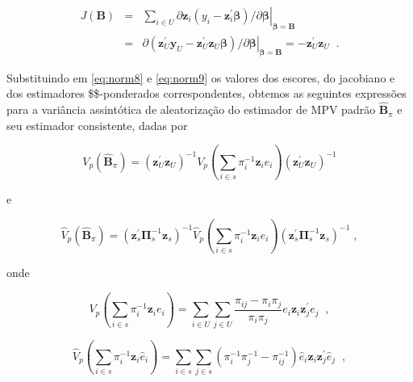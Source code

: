 \documentclass[]{book}
\begin{document}
\begin{eqnarray}
J\left( \mathbf{B}\right) &=&\left. \sum\nolimits_{i\in U}\partial \mathbf{z}
_{i}\left( y_{i}-\mathbf{z}_{i}^{\prime }\mathbf{\beta }\right) /\partial 
\mathbf{\beta }\right| _{\mathbf{\beta }=\mathbf{B}}  \label{eq:norm20} \\
&=&\left. \partial \left( \mathbf{z}_{U}^{\prime }\mathbf{y}_{U}-\mathbf{z}
_{U}^{\prime }\mathbf{z}_{U}\mathbf{\beta }\right) /\partial \mathbf{\beta }
\right| _{\mathbf{\beta }=\mathbf{B}}=-\mathbf{z}_{U}^{\prime }\mathbf{z}
_{U}\;\;.  \nonumber
\end{eqnarray}

Substituindo em \eqref{eq:norm8} e \eqref{eq:norm9} os valores dos escores,
do jacobiano e dos estimadores \$\pi \$-ponderados correspondentes,
obtemos as seguintes expressões para a variância assintótica de
aleatorização do estimador de MPV padrão \(\widehat{\mathbf{B}}_{\pi }\)
e seu estimador consistente, dadas por

\begin{equation}
V_{p}\left( \widehat{\mathbf{B}}_{\pi }\right) =\left( \mathbf{z}
_{U}^{\prime }\mathbf{z}_{U}\right) ^{-1}V_{p}\left( \sum\limits_{i\in s}\pi
_{i}^{-1}\mathbf{z}_{i}e_{i}\right) \left( \mathbf{z}_{U}^{\prime }\mathbf{z}
_{U}\right) ^{-1}  \label{eq:norm21}
\end{equation}

e

\begin{equation}
\hat{V}_{p}\left( \widehat{\mathbf{B}}_{\pi }\right) =\left( \mathbf{z}
_{s}^{\prime }\mathbf{\Pi }_{s}^{-1}\mathbf{z}_{s}\right) ^{-1}\hat{V}
_{p}\left( \sum\limits_{i\in s}\pi _{i}^{-1}\mathbf{z}_{i}e_{i}\right)
\left( \mathbf{z}_{s}^{\prime }\mathbf{\Pi }_{s}^{-1}\mathbf{z}_{s}\right)
^{-1}\;,  \label{eq:norm22}
\end{equation}

onde

\begin{equation}
V_{p}\left( \sum\limits_{i\in s}\pi _{i}^{-1}\mathbf{z}_{i}e_{i}\right)
=\sum\limits_{i\in U}\sum\limits_{j\in U}\frac{\pi _{ij}-\pi _{i}\pi _{j}}{
\pi _{i}\pi _{j}}e_{i}\mathbf{z}_{i}\mathbf{z}_{j}^{\prime }e_{j}\;\;,
\label{eq:norm23}
\end{equation}

\begin{equation}
\hat{V}_{p}\left( \sum\limits_{i\in s}\pi _{i}^{-1}\mathbf{z}_{i}\hat{e}
_{i}\right) =\sum\limits_{i\in s}\sum\limits_{j\in s}\left( \pi _{i}^{-1}\pi
_{j}^{-1}-\pi _{ij}^{-1}\right) \hat{e}_{i}\mathbf{z}_{i}\mathbf{z}
_{j}^{\prime }\hat{e}_{j}\;\;,  \label{eq:norm24}
\end{equation}
\end{document}
